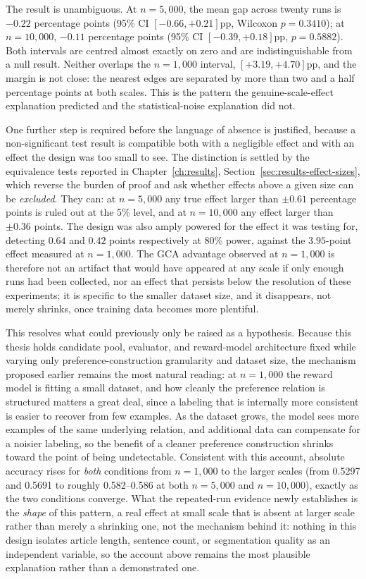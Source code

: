 The result is unambiguous. At $n=5{,}000$, the mean gap across twenty runs is
$-0.22$ percentage points (95\% CI $[-0.66, +0.21]$pp, Wilcoxon $p=0.3410$); at
$n=10{,}000$, $-0.11$ percentage points (95\% CI $[-0.39, +0.18]$pp, $p=0.5882$).
Both intervals are centred almost exactly on zero and are indistinguishable
from a null result. Neither overlaps the $n=1{,}000$ interval, $[+3.19,
+4.70]$pp, and the margin is not close: the nearest edges are separated by more
than two and a half percentage points at both scales. This is the pattern the
genuine-scale-effect explanation predicted and the statistical-noise
explanation did not.

One further step is required before the language of absence is justified,
because a non-significant test result is compatible both with a negligible
effect and with an effect the design was too small to see. The distinction is
settled by the equivalence tests reported in Chapter~\ref{ch:results},
Section~\ref{sec:results-effect-sizes}, which reverse the burden of proof and
ask whether effects above a given size can be \emph{excluded}. They can: at
$n=5{,}000$ any true effect larger than $\pm0.61$ percentage points is ruled out
at the 5\% level, and at $n=10{,}000$ any effect larger than $\pm0.36$ points.
The design was also amply powered for the effect it was testing for, detecting
$0.64$ and $0.42$ points respectively at 80\% power, against the $3.95$-point
effect measured at $n=1{,}000$. The GCA advantage observed at $n=1{,}000$ is
therefore not an artifact that would have appeared at any scale if only enough
runs had been collected, nor an effect that persists below the resolution of
these experiments; it is specific to the smaller dataset size, and it
disappears, not merely shrinks, once training data becomes more plentiful.

This resolves what could previously only be raised as a hypothesis. Because
this thesis holds candidate pool, evaluator, and reward-model architecture
fixed while varying only preference-construction granularity and dataset size,
the mechanism proposed earlier remains the most natural reading: at
$n=1{,}000$ the reward model is fitting a small dataset, and how cleanly the
preference relation is structured matters a great deal, since a labeling that
is internally more consistent is easier to recover from few examples. As the
dataset grows, the model sees more examples of the same underlying relation,
and additional data can compensate for a noisier labeling, so the benefit of a
cleaner preference construction shrinks toward the point of being
undetectable. Consistent with this account, absolute accuracy rises for
\emph{both} conditions from $n=1{,}000$ to the larger scales (from 0.5297 and
0.5691 to roughly 0.582--0.586 at both $n=5{,}000$ and $n=10{,}000$), exactly
as the two conditions converge. What the repeated-run evidence newly
establishes is the \emph{shape} of this pattern, a real effect at small
scale that is absent at larger scale rather than merely a shrinking one, not the
mechanism behind it: nothing in this design isolates article length, sentence
count, or segmentation quality as an independent variable, so the account
above remains the most plausible explanation rather than a demonstrated one.

